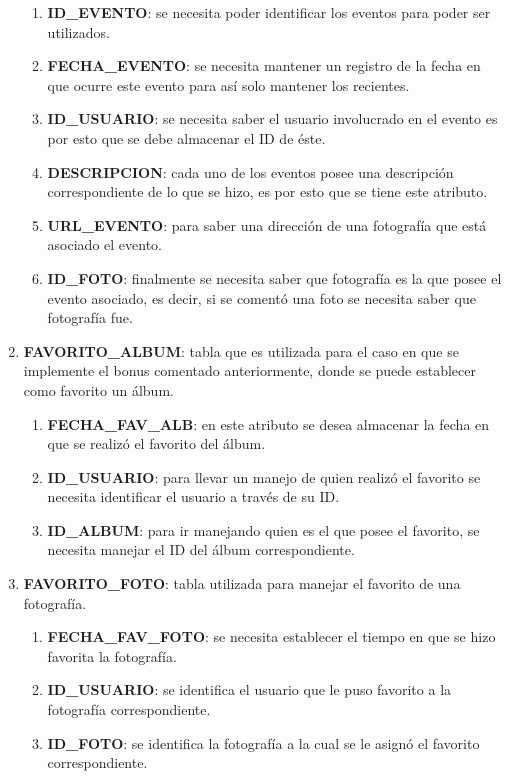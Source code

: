 \documentclass{memoria}
\begin{document}
\begin{enumerate}
	\begin{enumerate}
	\item \textbf{ID\_EVENTO}: se necesita poder identificar los eventos para poder ser utilizados. 
	\item \textbf{FECHA\_EVENTO}: se necesita mantener un registro de la fecha en que ocurre este evento para así solo mantener los recientes.
	\item \textbf{ID\_USUARIO}: se necesita saber el usuario involucrado en el evento es por esto que se debe almacenar el ID de éste.
	\item \textbf{DESCRIPCION}: cada uno de los eventos posee una descripción correspondiente de lo que se hizo, es por esto que se tiene este atributo.
	\item \textbf{URL\_EVENTO}: para saber una dirección de una fotografía que está asociado el evento.
	\item \textbf{ID\_FOTO}: finalmente se necesita saber que fotografía es la que posee el evento asociado, es decir, si se comentó una foto se necesita saber que fotografía fue.
	\end{enumerate}
	
\item \textbf{FAVORITO\_ALBUM}: tabla que es utilizada para el caso en que se implemente el bonus comentado anteriormente, donde se puede establecer como favorito un álbum.

	\begin{enumerate}
	\item \textbf{FECHA\_FAV\_ALB}: en este atributo se desea almacenar la fecha en que se realizó el favorito del álbum.
	\item \textbf{ID\_USUARIO}: para llevar un manejo de quien realizó el favorito se necesita identificar el usuario a través de su ID.
	\item \textbf{ID\_ALBUM}: para ir manejando quien es el que posee el favorito, se necesita manejar el ID del álbum correspondiente.
	\end{enumerate}

\item \textbf{FAVORITO\_FOTO}: tabla utilizada para manejar el favorito de una fotografía.

	\begin{enumerate}
	\item \textbf{FECHA\_FAV\_FOTO}: se necesita establecer el tiempo en que se hizo favorita la fotografía.
	\item \textbf{ID\_USUARIO}: se identifica el usuario que le puso favorito a la fotografía correspondiente.
	\item \textbf{ID\_FOTO}: se identifica la fotografía a la cual se le asignó el favorito correspondiente.
	

\end{enumerate}
\end{enumerate}
\end{document}
